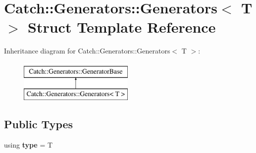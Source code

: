 \hypertarget{struct_catch_1_1_generators_1_1_generators}{}\section{Catch\+:\+:Generators\+:\+:Generators$<$ T $>$ Struct Template Reference}
\label{struct_catch_1_1_generators_1_1_generators}
Inheritance diagram for Catch\+:\+:Generators\+:\+:Generators$<$ T $>$\+:\begin{figure}[H]
\begin{center}
\leavevmode
\includegraphics[height=2.000000cm]{struct_catch_1_1_generators_1_1_generators}
\end{center}
\end{figure}
\subsection*{Public Types}
\begin{DoxyCompactItemize}
\item 
\mbox{\label{struct_catch_1_1_generators_1_1_generators_aab27f98a577b49532b2ca7556a84286b}} 
using {\bfseries type} = T
\end{DoxyCompactItemize}
